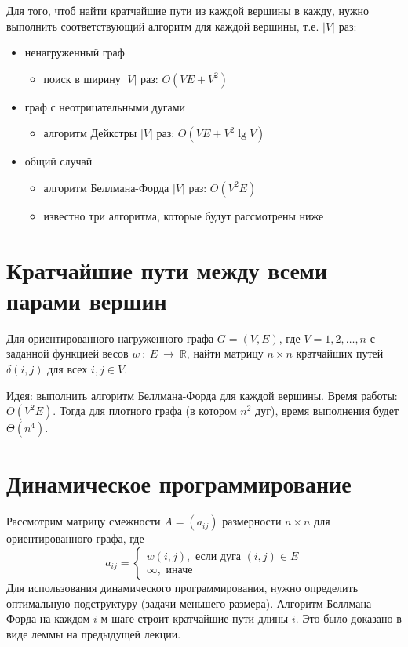 \documentclass[11pt]{article}
\begin{document}
Для того, чтоб найти кратчайшие пути из каждой вершины в кажду, нужно выполнить соответствующий алгоритм для каждой вершины, т.е. $|V|$ раз:
\begin{itemize}
\item ненагруженный граф
  \begin{itemize}
  \item поиск в ширину $|V|$ раз: $O(VE + V^2)$
  \end{itemize}
\item граф с неотрицательными дугами
  \begin{itemize}
  \item алгоритм Дейкстры $|V|$ раз: $O(VE + V^2 \lg V)$
  \end{itemize}
\item общий случай
  \begin{itemize}
  \item алгоритм Беллмана-Форда $|V|$ раз: $O(V^2 E)$
  \item известно три алгоритма, которые будут рассмотрены ниже
  \end{itemize}
\end{itemize}

\section{Кратчайшие пути между всеми парами вершин}
Для ориентированного нагруженного графа $G=(V, E)$, где $V = {1, 2, \ldots, n}$ с заданной функцией весов $w~:~E~\to~\mathbb{R}$, найти матрицу $n \times n$ кратчайших путей $\delta(i, j)$ для всех $i, j \in V$.

Идея: выполнить алгоритм Беллмана-Форда для каждой вершины. Время работы: $O(V^2 E)$. Тогда для плотного графа (в котором $n^2$ дуг), время выполнения будет $\Theta(n^4)$.

\section{Динамическое программирование}
Рассмотрим матрицу смежности $A = (a_{i j})$ размерности $n \times n$ для ориентированного графа, где
\begin{equation*}
  a_{i j} = \begin{cases}
    w(i, j), \text{ если дуга } (i, j) \in E \\
    \infty, \text{ иначе }
  \end{cases}
\end{equation*}
Для использования динамического программирования, нужно определить оптимальную подструктуру (задачи меньшего размера). Алгоритм Беллмана-Форда на каждом $i$-м шаге строит кратчайшие пути длины $i$. Это было доказано в виде леммы на предыдущей лекции.
\end{document}
